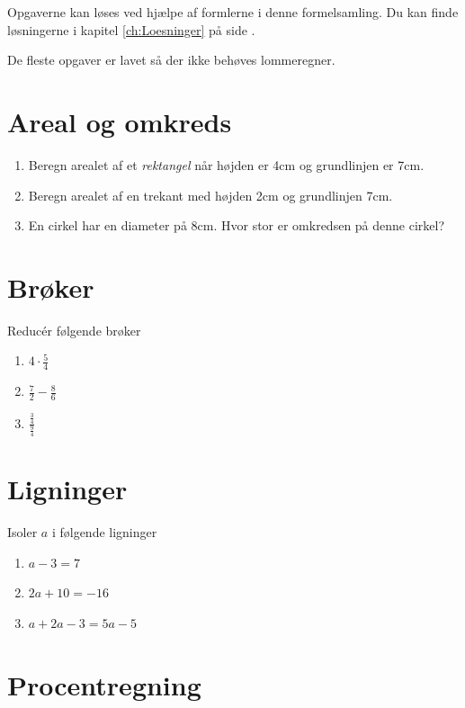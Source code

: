 \documentclass[11pt,a5paper,fleqn,leqno]{book}
\begin{document}
Opgaverne kan løses ved hjælpe af formlerne i denne formelsamling. Du kan finde løsningerne i kapitel \ref{ch:Loesninger} på side \pageref{ch:Loesninger}.

De fleste opgaver er lavet så der ikke behøves lommeregner.

\newpage

\section{Areal og omkreds}

\begin{enumerate}
\item \label{op:areal_1} Beregn arealet af et \textit{rektangel} når højden er 4cm og grundlinjen er 7cm.
\item \label{op:areal_2} Beregn arealet af en trekant med højden 2cm og grundlinjen 7cm.
\item \label{op:areal_3} En cirkel har en diameter på 8cm. Hvor stor er omkredsen på denne cirkel?
\end{enumerate}

\section{Brøker}

Reducér følgende brøker

\begin{enumerate}
\item \label{op:broek_1} $4 \cdot \frac{5}{4}$
\item \label{op:broek_2} $\frac{7}{2} - \frac{8}{6}$
\item \label{op:broek_3} $\frac{\frac{3}{4}}{\frac{9}{4}}$
\end{enumerate}

\section{Ligninger}

Isoler $a$ i følgende ligninger

\begin{enumerate}
\item \label{op:ligning_1} $a-3=7$
\item \label{op:ligning_2} $2a+10=-16$
\item \label{op:ligning_3} $a+2a-3 = 5a -5$
\end{enumerate}

\section{Procentregning}
\end{document}
